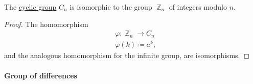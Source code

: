 \begin{proposition}\label{thm:cyclic_group_isomorphic_to_integers_modulo_n}
  The \hyperref[def:cyclic_group]{cyclic group} \( C_n \) is isomorphic to the group \hyperref[def:group_of_integers_modulo]{\( \BbbZ_n \)} of integers modulo \( n \).
\end{proposition}
\begin{proof}
  The homomorphism
  \begin{equation*}
    \begin{aligned}
      &\varphi: \BbbZ_n \to C_n \\
      &\varphi(k) \coloneqq a^k,
    \end{aligned}
  \end{equation*}
  and the analogous homomorphism for the infinite group, are isomorphisms.
\end{proof}

\paragraph{Group of differences}

